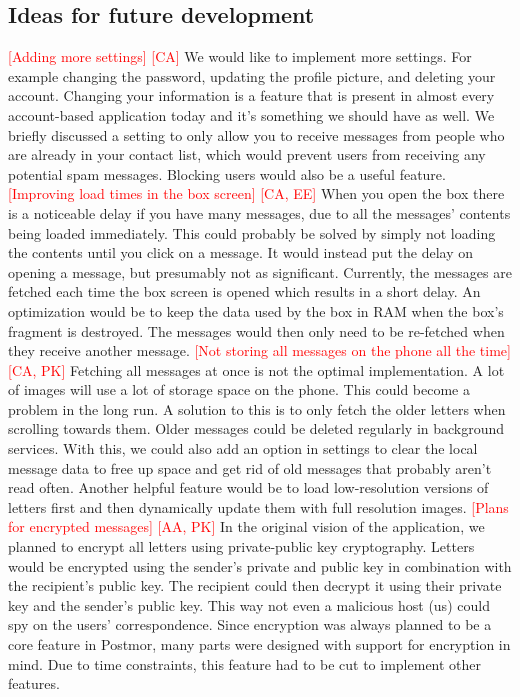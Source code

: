 \documentclass[acmlarge, review=false, screen=true]{acmart}
\begin{document}
    \subsection{Ideas for future development}
      \textcolor{red}{[Adding more settings] [CA]} \newline
      We would like to implement more settings. For example changing the password, updating the profile picture, and deleting your account. Changing your information is a feature that is present in almost every account-based application today and it’s something we should have as well. We briefly discussed a setting to only allow you to receive messages from people who are already in your contact list, which would prevent users from receiving any potential spam messages. Blocking users would also be a useful feature.
\newline\newline
      \textcolor{red}{[Improving load times in the box screen] [CA, EE]} \newline
      When you open the box there is a noticeable delay if you have many messages, due to all the messages’ contents being loaded immediately. This could probably be solved by simply not loading the contents until you click on a message. It would instead put the delay on opening a message, but presumably not as significant. Currently, the messages are fetched each time the box screen is opened which results in a short delay. An optimization would be to keep the data used by the box in RAM when the box’s fragment is destroyed. The messages would then only need to be re-fetched when they receive another message. 
\newline\newline
      \textcolor{red}{[Not storing all messages on the phone all the time] [CA, PK]} \newline
      Fetching all messages at once is not the optimal implementation. A lot of images will use a lot of storage space on the phone. This could become a problem in the long run. A solution to this is to only fetch the older letters when scrolling towards them. Older messages could be deleted regularly in background services. With this, we could also add an option in settings to clear the local message data to free up space and get rid of old messages that probably aren’t read often. Another helpful feature would be to load low-resolution versions of letters first and then dynamically update them with full resolution images.
\newline\newline
      \textcolor{red}{[Plans for encrypted messages] [AA, PK]} \newline
      In the original vision of the application, we planned to encrypt all letters using private-public key cryptography. Letters would be encrypted using the sender's private and public key in combination with the recipient's public key. The recipient could then decrypt it using their private key and the sender's public key. This way not even a malicious host (us) could spy on the users’ correspondence. Since encryption was always planned to be a core feature in Postmor, many parts were designed with support for encryption in mind. Due to time constraints, this feature had to be cut to implement other features.
\end{document}
